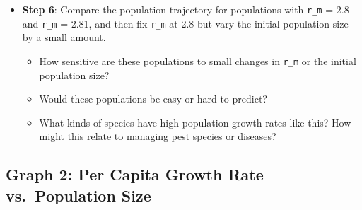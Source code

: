 \documentclass[
  a4paper]{book}
\begin{document}
\begin{itemize}
  \begin{itemize}
  \item
    How do the population dynamics change as \texttt{r\_m} increases?
  \item
    Is there a limit to how high \texttt{r\_m} can be?
  \item
    What happens when \texttt{r\_m} is 2.8, 3.0 or 3.1\footnote{The behaviour where \texttt{r\_m} values above 3 cause the population to become very negative, is a mathematical artefact caused by numerical instability in the discrete-time logistic growth model. When the growth rate is too high, the population can overshoot its carrying capacity, and the formula's negative feedback term can drive the population to unrealistic, negative values. This issue arises because the model doesn't impose biological constraints, such as preventing population sizes from falling below zero. In real biological systems, such negative values would not occur.}? Are the dynamics predictable or chaotic?
  \end{itemize}
\item
  \textbf{Step 6}: Compare the population trajectory for populations with \texttt{r\_m} = 2.8 and \texttt{r\_m} = 2.81, and then fix \texttt{r\_m} at 2.8 but vary the initial population size by a small amount.

  \begin{itemize}
  \item
    How sensitive are these populations to small changes in \texttt{r\_m} or the initial population size?
  \item
    Would these populations be easy or hard to predict?
  \item
    What kinds of species have high population growth rates like this? How might this relate to managing pest species or diseases?
  \end{itemize}
\end{itemize}

\subsection{Graph 2: Per Capita Growth Rate vs.~Population Size}\label{graph-2-per-capita-growth-rate-vs.-population-size}
\end{document}
